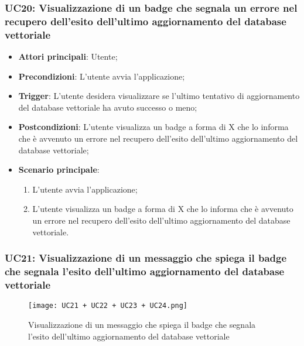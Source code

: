 \subsubsection{UC20: Visualizzazione di un badge che segnala un errore nel recupero dell'esito dell'ultimo aggiornamento del database vettoriale}
\begin{itemize}
    \item \textbf{Attori principali}: Utente;
    \item \textbf{Precondizioni}: L'utente avvia l'applicazione;
    \item \textbf{Trigger}: L'utente desidera visualizzare se l'ultimo tentativo di aggiornamento del database vettoriale
    ha avuto successo o meno;
    \item \textbf{Postcondizioni}: L'utente visualizza un badge a forma di X che lo informa che è avvenuto un errore nel recupero
    dell'esito dell'ultimo aggiornamento del database vettoriale;
    \item \textbf{Scenario principale}:
    \begin{enumerate}
        \item L'utente avvia l'applicazione;
        \item L'utente visualizza un badge a forma di X che lo informa che è avvenuto un errore nel recupero
        dell'esito dell'ultimo aggiornamento del database vettoriale.
    \end{enumerate}
\end{itemize}


\hypertarget{UC21}{}
\subsubsection{UC21: Visualizzazione di un messaggio che spiega il badge che segnala l'esito dell'ultimo aggiornamento del database vettoriale}

\begin{figure}[h]
    \centering
    \texttt{[image: UC21 + UC22 + UC23 + UC24.png]}
    \caption{Visualizzazione di un messaggio che spiega il badge che segnala l'esito dell'ultimo aggiornamento del database vettoriale}
\end{figure}


